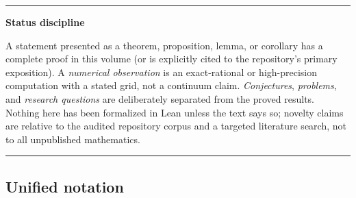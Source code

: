 \documentclass[11pt,oneside]{article}
\numberwithin{equation}{section}
\theoremstyle{definition}
\theoremstyle{remark}
\newenvironment{statusbox}[1]{%
  \par\smallskip\noindent\begin{center}\begin{minipage}{0.94\textwidth}%
  \hrule\vspace{0.5em}\noindent\textbf{#1}\par\smallskip
}{%
  \vspace{0.5em}\hrule\end{minipage}\end{center}\smallskip
}
\begin{document}
\begin{statusbox}{Status discipline}
A statement presented as a theorem, proposition, lemma, or corollary has
a complete proof in this volume (or is explicitly cited to the
repository's primary exposition).  A \emph{numerical observation} is an
exact-rational or high-precision computation with a stated grid, not a
continuum claim.  \emph{Conjectures}, \emph{problems}, and
\emph{research questions} are deliberately separated from the proved
results.  Nothing here has been formalized in Lean unless the text says
so; novelty claims are relative to the audited repository corpus and a
targeted literature search, not to all unpublished mathematics.
\end{statusbox}

\subsection*{Unified notation}
\end{document}
